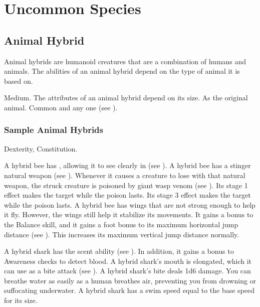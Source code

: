 \chapter{Uncommon Species}\label{Uncommon Species}

\section{Animal Hybrid}
  Animal hybrids are humanoid creatures that are a combination of humans and animals.
  The abilities of an animal hybrid depend on the type of animal it is based on.

   Medium.
   The attributes of an animal hybrid depend on its size.
   As the original animal.
   Common and any one  (see ).

  \subsection{Sample Animal Hybrids}


      Dexterity,  Constitution.
    \begin{itemize}
       A hybrid bee has , allowing it to see clearly in  (see ).
       A hybrid bee has a stinger natural weapon (see ).
        Whenever it causes a creature to lose  with that natural weapon, the struck creature is poisoned by giant wasp venom (see ).
        Its stage 1 effect makes the target \slowed while the poison lasts.
        Its stage 3 effect makes the target \immobilized while the poison lasts.
       A hybrid bee has wings that are not strong enough to help it fly.
        However, the wings still help it stabilize its movements.
        It gains a  bonus to the Balance skill, and it gains a  foot bonus to its maximum horizontal jump distance (see ).
        This increases its maximum vertical jump distance normally.
    \end{itemize}


    \begin{itemize}
       A hybrid shark has the scent ability (see ).
        In addition, it gains a  bonus to Awareness checks to detect blood.
       A hybrid shark's mouth is elongated, which it can use as a bite attack (see ).
        A hybrid shark's bite deals 1d6 damage.
       You can breathe water as easily as a human breathes air, preventing you from drowning or suffocating underwater.
       A hybrid shark has a swim speed equal to the base speed for its size.
    \end{itemize}

